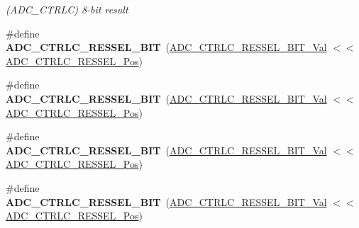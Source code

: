 \begin{DoxyCompactItemize}
\begin{DoxyCompactList}\small\item\em (A\+D\+C\+\_\+\+C\+T\+R\+L\+C) 8-\/bit result \end{DoxyCompactList}\item 
\hypertarget{group___s_a_m_l21___a_d_c_ga36d45b642b589ae7e1154a59b545f912}{}\#define {\bfseries A\+D\+C\+\_\+\+C\+T\+R\+L\+C\+\_\+\+R\+E\+S\+S\+E\+L\+\_\+B\+I\+T}~(\hyperlink{group___s_a_m_l21___a_d_c_gafa811f4a3d6fecef363d471891e2867f}{A\+D\+C\+\_\+\+C\+T\+R\+L\+C\+\_\+\+R\+E\+S\+S\+E\+L\+\_\+B\+I\+T\+\_\+\+Val}    $<$$<$ \hyperlink{group___s_a_m_l21___a_d_c_ga8e61247becfe523ab5564856a3896df0}{A\+D\+C\+\_\+\+C\+T\+R\+L\+C\+\_\+\+R\+E\+S\+S\+E\+L\+\_\+\+Pos})\label{group___s_a_m_l21___a_d_c_ga36d45b642b589ae7e1154a59b545f912}

\item 
\hypertarget{group___s_a_m_l21___a_d_c_gac08bb7efe8b093d47f22eb46b5b8c9e0}{}\#define {\bfseries A\+D\+C\+\_\+\+C\+T\+R\+L\+C\+\_\+\+R\+E\+S\+S\+E\+L\+\_\+B\+I\+T}~(\hyperlink{group___s_a_m_l21___a_d_c_gab6dc26c78973c7178ab7894f3fe69ff8}{A\+D\+C\+\_\+\+C\+T\+R\+L\+C\+\_\+\+R\+E\+S\+S\+E\+L\+\_\+B\+I\+T\+\_\+\+Val}    $<$$<$ \hyperlink{group___s_a_m_l21___a_d_c_ga8e61247becfe523ab5564856a3896df0}{A\+D\+C\+\_\+\+C\+T\+R\+L\+C\+\_\+\+R\+E\+S\+S\+E\+L\+\_\+\+Pos})\label{group___s_a_m_l21___a_d_c_gac08bb7efe8b093d47f22eb46b5b8c9e0}

\item 
\hypertarget{group___s_a_m_l21___a_d_c_gaf9fbea4530bfd5cc7b2b199116a25426}{}\#define {\bfseries A\+D\+C\+\_\+\+C\+T\+R\+L\+C\+\_\+\+R\+E\+S\+S\+E\+L\+\_\+B\+I\+T}~(\hyperlink{group___s_a_m_l21___a_d_c_gac9552e22763d3922fa97b53d3f79a69a}{A\+D\+C\+\_\+\+C\+T\+R\+L\+C\+\_\+\+R\+E\+S\+S\+E\+L\+\_\+B\+I\+T\+\_\+\+Val}    $<$$<$ \hyperlink{group___s_a_m_l21___a_d_c_ga8e61247becfe523ab5564856a3896df0}{A\+D\+C\+\_\+\+C\+T\+R\+L\+C\+\_\+\+R\+E\+S\+S\+E\+L\+\_\+\+Pos})\label{group___s_a_m_l21___a_d_c_gaf9fbea4530bfd5cc7b2b199116a25426}

\item 
\hypertarget{group___s_a_m_l21___a_d_c_ga036134d47f14a0267a56cfdeffe8fda4}{}\#define {\bfseries A\+D\+C\+\_\+\+C\+T\+R\+L\+C\+\_\+\+R\+E\+S\+S\+E\+L\+\_\+B\+I\+T}~(\hyperlink{group___s_a_m_l21___a_d_c_gab3c8528153efdad64697e48470c3aa10}{A\+D\+C\+\_\+\+C\+T\+R\+L\+C\+\_\+\+R\+E\+S\+S\+E\+L\+\_\+B\+I\+T\+\_\+\+Val}     $<$$<$ \hyperlink{group___s_a_m_l21___a_d_c_ga8e61247becfe523ab5564856a3896df0}{A\+D\+C\+\_\+\+C\+T\+R\+L\+C\+\_\+\+R\+E\+S\+S\+E\+L\+\_\+\+Pos})\label{group___s_a_m_l21___a_d_c_ga036134d47f14a0267a56cfdeffe8fda4}


\end{DoxyCompactItemize}
